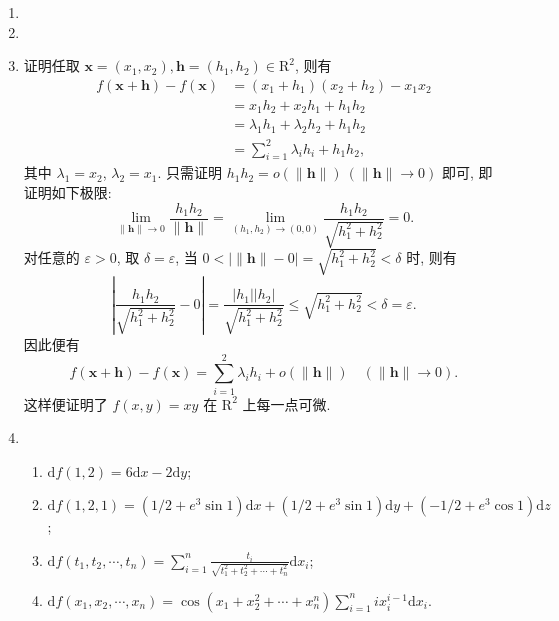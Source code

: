 \documentclass[a4paper, 11pt]{ctexart}
\newcommand{\diff}{\mathrm{d}}
\begin{document}
\begin{enumerate}
    \item %
    \item %
    \item %
        {\heiti 证明}\quad 任取 $\boldsymbol{x} = (x_1, x_2), \boldsymbol{h} = (h_1, h_2) \in \mathrm{R}^2$, 则有
        \begin{align*}
            f(\boldsymbol{x} + \boldsymbol{h}) - f(\boldsymbol{x}) &= (x_1 + h_1)(x_2 + h_2) - x_1x_2 \\
            &= x_1h_2 + x_2h_1 + h_1h_2 \\
            &= \lambda_1h_1 + \lambda_2h_2 + h_1h_2 \\
            &= \sum_{i=1}^2\lambda_ih_i + h_1h_2,   
        \end{align*}
        其中 $\lambda_1 = x_2$, $\lambda_2 = x_1$. 只需证明 $h_1h_2 = o(\|\boldsymbol{h}\|)\ (\|\boldsymbol{h}\|\to0)$ 即可, 即证明如下极限:
        \[
            \lim_{\|\boldsymbol{h}\|\to0}\frac{h_1h_2}{\|\boldsymbol{h}\|} = \lim_{(h_1, h_2) \to (0, 0)}\frac{h_1h_2}{\sqrt{h_1^2 + h_2^2}} = 0.    
        \]
        对任意的 $\varepsilon > 0$, 取 $\delta = \varepsilon$, 当 $0 < |\|\boldsymbol{h}\| - 0| = \sqrt{h_1^2 + h_2^2} < \delta$ 时, 则有
        \[
            \left| \frac{h_1h_2}{\sqrt{h_1^2+h_2^2}} - 0 \right| = \frac{|h_1||h_2|}{\sqrt{h_1^2+h_2^2}} \leqslant \sqrt{h_1^2 + h_2^2} < \delta = \varepsilon.   
        \]
        因此便有
        \[
            f(\boldsymbol{x} + \boldsymbol{h}) - f(\boldsymbol{x}) = \sum_{i=1}^2\lambda_ih_i + o(\|\boldsymbol{h}\|)\quad (\|\boldsymbol{h}\| \to 0).
        \]
        这样便证明了 $f(x, y) = xy$ 在 $\mathrm{R}^2$ 上每一点可微.
    \item %
        \begin{enumerate}[(1)]
            \item %
                $\diff{f(1, 2)} = 6\diff{x} - 2\diff{y}$;
            \item %
                $\diff{f(1, 2, 1)} = (1/2 + e^3\sin1)\diff x + (1/2 + e^3\sin1)\diff y + (-1/2 + e^3\cos1)\diff z$;
            \item %
                $\diff f(t_1, t_2, \cdots, t_n) = \displaystyle{\sum_{i=1}^n}\frac{t_i}{\sqrt{t_1^2 + t_2^2 + \cdots + t_n^2}}\diff x_i$;
            \item %
                $\diff f(x_1, x_2, \cdots, x_n) = \cos(x_1 + x_2^2 + \cdots + x_n^n)\displaystyle{\sum_{i=1}^nix_i^{i-1}\diff x_i}$.
        \end{enumerate}

\end{enumerate}
\end{document}
